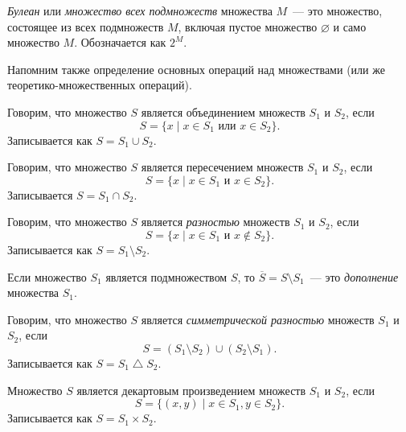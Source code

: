 \begin{definition}[Булеан]
    \emph{Булеан} или \emph{множество всех подмножеств} множества $M$~--- это множество, состоящее из всех подмножеств $M$, включая пустое множество $\varnothing$ и само множество $M$.
    Обозначается как $2^M$.
\end{definition}

Напомним также определение основных операций над множествами (или же теоретико-множественных операций).

\begin{definition}
    Говорим, что множество $S$ является объединением множеств $S_1$ и $S_2$, если
    \[S = \{ x \mid x \in S_1 \text{ или } x \in S_2\}.\]
    Записывается как $S = S_1 \cup S_2$.
\end{definition}

\begin{definition}
    Говорим, что множество $S$ является пересечением множеств $S_1$ и $S_2$, если
    \[S = \{ x \mid x \in S_1 \text{ и } x \in S_2\}.\]
    Записывается $S = S_1 \cap S_2$.
\end{definition}

\begin{definition}
    Говорим, что множество $S$ является \emph{разностью} множеств $S_1$ и $S_2$, если
    \[S = \{ x \mid x \in S_1 \text{ и } x \notin S_2\}.\]
    Записывается как $S = S_1 \setminus S_2$.
\end{definition}

\begin{definition}
    Если множество $S_1$ является подмножеством $S$, то $\overline{S} = S \setminus S_1$~--- это \emph{дополнение} множества $S_1$.
\end{definition}

\begin{definition}
    Говорим, что множество $S$ является \emph{симметрической разностью} множеств $S_1$ и $S_2$, если
    \[S = (S_1 \setminus S_2) \cup (S_2 \setminus S_1).\]
    Записывается как $S = S_1 \bigtriangleup S_2$.
\end{definition}


\begin{definition}
    Множество $S$ является декартовым произведением множеств $S_1$ и $S_2$, если
    \[S = \{ (x,y) \mid x \in S_1, y \in S_2 \}.\]
    Записывается как $S = S_1 \times S_2$.
\end{definition}

